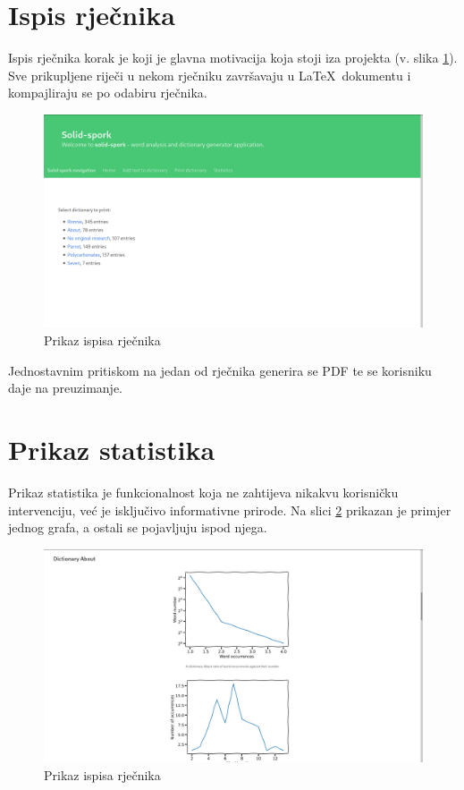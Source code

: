 \documentclass{foi}
\begin{document}
\section{Ispis rječnika}

Ispis rječnika korak je koji je glavna motivacija koja stoji iza projekta (v.
slika \ref{ht_print}). Sve prikupljene riječi u nekom rječniku završavaju u
\LaTeX\ dokumentu i kompajliraju se po odabiru rječnika.

\begin{figure}[!h]
	\includegraphics[width=\textwidth]{slike/solid-spork-print.png}
	\caption{Prikaz ispisa rječnika}
	\label{ht_print}
\end{figure}

Jednostavnim pritiskom na jedan od rječnika generira se PDF te se korisniku
daje na preuzimanje.

\section{Prikaz statistika}

Prikaz statistika je funkcionalnost koja ne zahtijeva nikakvu korisničku
intervenciju, već je isključivo informativne prirode. Na slici \ref{ht_stats}
prikazan je primjer jednog grafa, a ostali se pojavljuju ispod njega.

\begin{figure}[!h]
	\includegraphics[width=\textwidth]{slike/solid-spork-stats.png}
	\caption{Prikaz ispisa rječnika}
	\label{ht_stats}
\end{figure}
\end{document}
